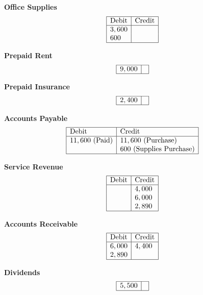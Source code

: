 \documentclass[12pt,a4paper]{book}
\begin{document}
\vspace{0.3cm}
\textbf{Office Supplies}
\[
\begin{array}{|l|l|}
\hline
\text{Debit} & \text{Credit} \\
\hline
3,600 & \\
600   & \\
\hline
\end{array}
\]

\vspace{0.3cm}
\textbf{Prepaid Rent}
\[
\begin{array}{|l|l|}
\hline
9,000 & \\
\hline
\end{array}
\]

\vspace{0.3cm}
\textbf{Prepaid Insurance}
\[
\begin{array}{|l|l|}
\hline
2,400 & \\
\hline
\end{array}
\]

\vspace{0.3cm}
\textbf{Accounts Payable}
\[
\begin{array}{|l|l|}
\hline
\text{Debit} & \text{Credit} \\
\hline
11,600\ (\text{Paid}) & 11,600\ (\text{Purchase}) \\
    & 600\ (\text{Supplies Purchase}) \\
\hline
\end{array}
\]

\vspace{0.3cm}
\textbf{Service Revenue}
\[
\begin{array}{|l|l|}
\hline
\text{Debit} & \text{Credit} \\
\hline
 & 4,000 \\
 & 6,000 \\
 & 2,890 \\
\hline
\end{array}
\]

\vspace{0.3cm}
\textbf{Accounts Receivable}
\[
\begin{array}{|l|l|}
\hline
\text{Debit} & \text{Credit} \\
\hline
6,000 & 4,400 \\
2,890 & \\
\hline
\end{array}
\]

\vspace{0.3cm}
\textbf{Dividends}
\[
\begin{array}{|l|l|}
\hline
5,500 & \\
\hline
\end{array}
\]
\end{document}
